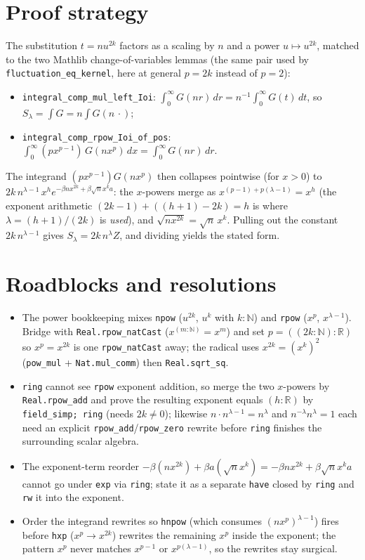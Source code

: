 \documentclass[11pt]{article}
\begin{document}
\section{Proof strategy}
The substitution $t=n u^{2k}$ factors as a scaling by $n$ and a power $u\mapsto u^{2k}$, matched to the
two Mathlib change-of-variables lemmas (the same pair used by \texttt{fluctuation\_eq\_kernel}, here at
general $p=2k$ instead of $p=2$):
\begin{itemize}
\item \texttt{integral\_comp\_mul\_left\_Ioi}: $\int_0^\infty G(n r)\,dr=n^{-1}\int_0^\infty G(t)\,dt$,
so $S_\lambda=\int G=n\int G(n\,\cdot)$;
\item \texttt{integral\_comp\_rpow\_Ioi\_of\_pos}:
$\int_0^\infty (p x^{p-1})\,G(n x^p)\,dx=\int_0^\infty G(n r)\,dr$.
\end{itemize}
The integrand $ (p x^{p-1}) G(n x^p)$ then collapses pointwise (for $x>0$) to
$2k\,n^{\lambda-1}\,x^h e^{-\beta n x^{2k}+\beta\sqrt n x^k a}$: the $x$-powers merge as
$x^{(p-1)+p(\lambda-1)}=x^{h}$ (the exponent arithmetic $(2k-1)+((h{+}1)-2k)=h$ is where
$\lambda=(h{+}1)/(2k)$ is \emph{used}), and $\sqrt{n x^{2k}}=\sqrt n\,x^k$. Pulling out the constant
$2k\,n^{\lambda-1}$ gives $S_\lambda=2k\,n^{\lambda}Z$, and dividing yields the stated form.

\section{Roadblocks and resolutions}
\begin{itemize}
\item The power bookkeeping mixes \texttt{npow} ($u^{2k}$, $u^k$ with $k:\mathbb N$) and \texttt{rpow}
($x^p$, $x^{\lambda-1}$). Bridge with \texttt{Real.rpow\_natCast} ($x^{(m:\mathbb N)}=x^m$) and set
$p=((2k:\mathbb N):\mathbb R)$ so $x^p=x^{2k}$ is one \texttt{rpow\_natCast} away; the radical uses
$x^{2k}=(x^k)^2$ (\texttt{pow\_mul} + \texttt{Nat.mul\_comm}) then \texttt{Real.sqrt\_sq}.
\item \texttt{ring} cannot see \texttt{rpow} exponent addition, so merge the two $x$-powers by
\texttt{Real.rpow\_add} and prove the resulting exponent equals $(h:\mathbb R)$ by
\texttt{field\_simp; ring} (needs $2k\ne0$); likewise $n\cdot n^{\lambda-1}=n^\lambda$ and
$n^{-\lambda}n^\lambda=1$ each need an explicit \texttt{rpow\_add}/\texttt{rpow\_zero} rewrite before
\texttt{ring} finishes the surrounding scalar algebra.
\item The exponent-term reorder $-\beta(nx^{2k})+\beta a(\sqrt n x^k)=-\beta n x^{2k}+\beta\sqrt n x^k a$
cannot go under \texttt{exp} via \texttt{ring}; state it as a separate \texttt{have} closed by
\texttt{ring} and \texttt{rw} it into the exponent.
\item Order the integrand rewrites so \texttt{hnpow} (which consumes $(n x^p)^{\lambda-1}$) fires
before \texttt{hxp} ($x^p\to x^{2k}$) rewrites the remaining $x^p$ inside the exponent; the pattern
$x^p$ never matches $x^{p-1}$ or $x^{p(\lambda-1)}$, so the rewrites stay surgical.
\end{itemize}
\end{document}
